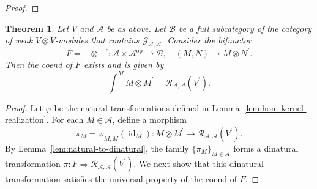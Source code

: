 \documentclass[12pt, english]{article}
\numberwithin{equation}{section}
\DeclareMathOperator{\id}{id}
\DeclareMathOperator{\opp}{op}
\theoremstyle{plain}
\newtheorem{theorem}[lemma]{Theorem}
\theoremstyle{definition}
\theoremstyle{remark}
\begin{document}
\begin{proof}
	\end{proof}
	
	
	
	
	\begin{theorem} \label{thm:regular-coend-realization}
		Let $V$ and $\mathcal{A}$ be as above. Let $\mathcal{B} $ be a full subcategory of the category of weak $V \otimes V$-modules that contains
		$\mathcal{G}_{\mathcal{A}, \mathcal{A}}$.
		Consider the bifunctor
		\[
		F = - \otimes -^\prime \colon \mathcal{A} \times \mathcal{A}^{\opp} \longrightarrow \mathcal{B},
		\quad (M, N) \longrightarrow M \otimes N^\prime.
		\]
		Then the coend of $F$ exists and is given by
		\[
		\int^{M} M \otimes M^\prime = \mathcal{R}_{\mathcal{A}, \mathcal{A}}(V^\prime).
		\]
	\end{theorem}
	
	\begin{proof}
		
		Let $\varphi$ be the natural transformations defined in Lemma~\ref{lem:hom-kernel-realization}.
		For each $M \in \mathcal{A}$, define a  morphism
		\[
		\pi_M = \varphi_{M, M}(\id_M) \colon M\otimes M^\prime \to \mathcal{R}_{\mathcal{A}, \mathcal{A}}(V^\prime).
		\]
		By Lemma~\ref{lem:natural-to-dinatural},
		the family $\{\pi_M\}_{M \in \mathcal{A} }$ forms a dinatural transformation $\pi \colon F \ddot{ \Rightarrow } \mathcal{R}_{\mathcal{A}, \mathcal{A}}(V^\prime)$.
		We next show that this dinatural transformation satisfies the universal property of the coend of $F$.
		

\end{proof}
\end{document}

